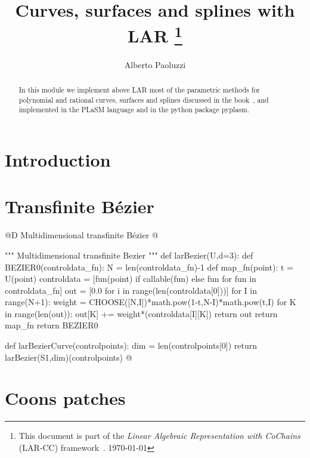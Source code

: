 \documentclass[11pt,oneside]{article}	%
\title{Curves, surfaces and splines with LAR
\footnote{This document is part of the \emph{Linear Algebraic Representation with CoChains} (LAR-CC) framework~\cite{cclar-proj:2013:00}. \today}
}
\author{Alberto Paoluzzi}
\begin{document}
\maketitle
\nonstopmode

\begin{abstract}
In this module we implement above LAR most of the parametric methods for polynomial and rational curves, surfaces and splines discussed in the book~\cite{Paoluzzi2003a}, and implemented in the PLaSM language and in the python package pyplasm. 
\end{abstract}

\tableofcontents

\section{Introduction}

\section{Transfinite B\'ezier}
@D Multidimensional transfinite B\'ezier
@{""" Multidimensional transfinite Bezier """
def larBezier(U,d=3):
	def BEZIER0(controldata_fn):
		N = len(controldata_fn)-1
		def map_fn(point):
			t = U(point)
			controldata = [fun(point) if callable(fun) else fun 
				for fun in controldata_fn]
			out = [0.0 for i in range(len(controldata[0]))]		
			for I in range(N+1):
				weight = CHOOSE([N,I])*math.pow(1-t,N-I)*math.pow(t,I)
				for K in range(len(out)):  out[K] += weight*(controldata[I][K])
			return out
		return map_fn
	return BEZIER0

def larBezierCurve(controlpoints):
	dim = len(controlpoints[0])
	return larBezier(S1,dim)(controlpoints)
@}
\section{Coons patches}
\end{document}
